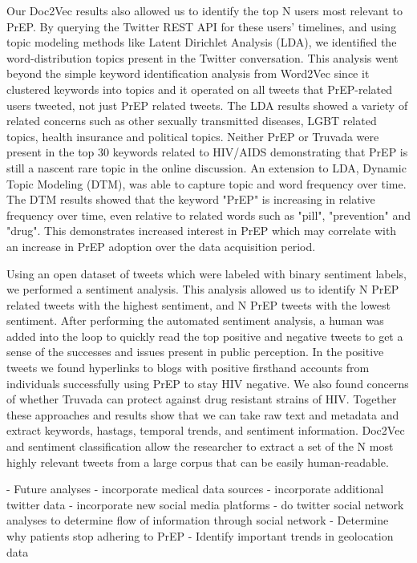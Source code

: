 Our Doc2Vec results also allowed us to identify the top N users most relevant to PrEP. By querying the Twitter REST API for these users' timelines, and using topic modeling methods like Latent Dirichlet Analysis (LDA), we identified the word-distribution topics present in the Twitter conversation. This analysis went beyond the simple keyword identification analysis from Word2Vec since it clustered keywords into topics and it operated on all tweets that PrEP-related users tweeted, not just PrEP related tweets. The LDA results showed a variety of related concerns such as other sexually transmitted diseases, LGBT related topics, health insurance and political topics. Neither PrEP or Truvada were present in the top 30 keywords related to HIV/AIDS demonstrating that PrEP is still a nascent rare topic in the online discussion. An extension to LDA, Dynamic Topic Modeling (DTM), was able to capture topic and word frequency over time. The DTM results showed that the keyword "PrEP" is increasing in relative frequency over time, even relative to related words such as "pill", "prevention" and "drug". This demonstrates increased interest in PrEP which may correlate with an increase in PrEP adoption over the data acquisition period.

Using an open dataset of tweets which were labeled with binary sentiment labels, we performed a sentiment analysis. This analysis allowed us to identify N PrEP related tweets with the highest sentiment, and N PrEP tweets with the lowest sentiment. After performing the automated sentiment analysis, a human was added into the loop to quickly read the top positive and negative tweets to get a sense of the successes and issues present in public perception. In the positive tweets we found hyperlinks to blogs with positive firsthand accounts from individuals successfully using PrEP to stay HIV negative. We also found concerns of whether Truvada can protect against drug resistant strains of HIV. Together these approaches and results show that we can take raw text and metadata and extract keywords, hastags, temporal trends, and sentiment information. Doc2Vec and sentiment classification allow the researcher to extract a set of the N most highly relevant tweets from a large corpus that can be easily human-readable.

- Future analyses
  - incorporate medical data sources
  - incorporate additional twitter data
  - incorporate new social media platforms
  - do twitter social network analyses to determine flow of information through social network
  - Determine why patients stop adhering to PrEP
  - Identify important trends in geolocation data

